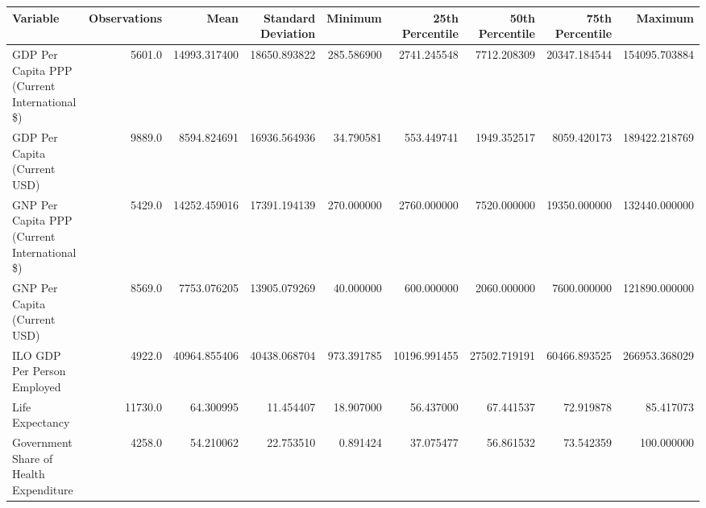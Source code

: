 \begin{tabular}{lrrrrrrrr}
\toprule
                                    Variable &  Observations &         Mean &  Standard Deviation &    Minimum &  25th Percentile &  50th Percentile &  75th Percentile &       Maximum \\
\midrule
GDP Per Capita PPP (Current International \$) & 5601.0 & 14993.317400 & 18650.893822 & 285.586900 & 2741.245548 & 7712.208309 & 20347.184544 & 154095.703884 \\
GDP Per Capita (Current USD) & 9889.0 & 8594.824691 & 16936.564936 & 34.790581 & 553.449741 & 1949.352517 & 8059.420173 & 189422.218769 \\
GNP Per Capita PPP (Current International \$) & 5429.0 & 14252.459016 & 17391.194139 & 270.000000 & 2760.000000 & 7520.000000 & 19350.000000 & 132440.000000 \\
GNP Per Capita (Current USD) & 8569.0 & 7753.076205 & 13905.079269 & 40.000000 & 600.000000 & 2060.000000 & 7600.000000 & 121890.000000 \\
ILO GDP Per Person Employed & 4922.0 & 40964.855406 & 40438.068704 & 973.391785 & 10196.991455 & 27502.719191 & 60466.893525 & 266953.368029 \\
Life Expectancy & 11730.0 & 64.300995 & 11.454407 & 18.907000 & 56.437000 & 67.441537 & 72.919878 & 85.417073 \\
Government Share of Health Expenditure & 4258.0 & 54.210062 & 22.753510 & 0.891424 & 37.075477 & 56.861532 & 73.542359 & 100.000000 \\
\bottomrule
\end{tabular}
